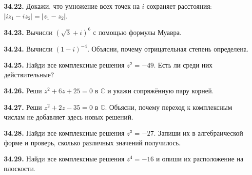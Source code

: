 \noindent\begin{minipage}[t]{\linewidth}\textbf{34.22.} Докажи, что умножение всех точек на \(i\) сохраняет расстояния: \(|iz_1-iz_2|=|z_1-z_2|\).\par\end{minipage}\par
\noindent\begin{minipage}[t]{\linewidth}\textbf{34.23.} Вычисли \((\sqrt3+i)^6\) с помощью формулы Муавра.\par\end{minipage}\par
\noindent\begin{minipage}[t]{\linewidth}\textbf{34.24.} Вычисли \((1-i)^{-4}\). Объясни, почему отрицательная степень определена.\par\end{minipage}\par
\noindent\begin{minipage}[t]{\linewidth}\textbf{34.25.} Найди все комплексные решения \(z^2=-49\). Есть ли среди них действительные?\par\end{minipage}\par
\noindent\begin{minipage}[t]{\linewidth}\textbf{34.26.} Реши \(z^2+6z+25=0\) в \(\mathbb C\) и укажи сопряжённую пару корней.\par\end{minipage}\par
\noindent\begin{minipage}[t]{\linewidth}\textbf{34.27.} Реши \(z^2+2z-35=0\) в \(\mathbb C\). Объясни, почему переход к комплексным числам не добавляет здесь новых решений.\par\end{minipage}\par
\noindent\begin{minipage}[t]{\linewidth}\textbf{34.28.}\starmark{} Найди все комплексные решения \(z^3=-27\). Запиши их в алгебраической форме и проверь, сколько различных значений получилось.\par\end{minipage}\par
\noindent\begin{minipage}[t]{\linewidth}\textbf{34.29.}\starmark{} Найди все комплексные решения \(z^4=-16\) и опиши их расположение на плоскости.\par\end{minipage}\par
